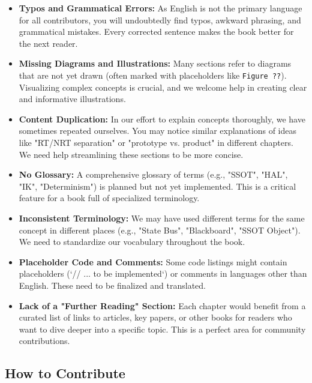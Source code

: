\begin{itemize}
    \item \textbf{Typos and Grammatical Errors:} As English is not the primary language for all contributors, you will undoubtedly find typos, awkward phrasing, and grammatical mistakes. Every corrected sentence makes the book better for the next reader.

    \item \textbf{Missing Diagrams and Illustrations:} Many sections refer to diagrams that are not yet drawn (often marked with placeholders like \texttt{Figure ??}). Visualizing complex concepts is crucial, and we welcome help in creating clear and informative illustrations.

    \item \textbf{Content Duplication:} In our effort to explain concepts thoroughly, we have sometimes repeated ourselves. You may notice similar explanations of ideas like "RT/NRT separation" or "prototype vs. product" in different chapters. We need help streamlining these sections to be more concise.

    \item \textbf{No Glossary:} A comprehensive glossary of terms (e.g., "SSOT", "HAL", "IK", "Determinism") is planned but not yet implemented. This is a critical feature for a book full of specialized terminology.

    \item \textbf{Inconsistent Terminology:} We may have used different terms for the same concept in different places (e.g., "State Bus", "Blackboard", "SSOT Object"). We need to standardize our vocabulary throughout the book.

    \item \textbf{Placeholder Code and Comments:} Some code listings might contain placeholders (`// ... to be implemented`) or comments in languages other than English. These need to be finalized and translated.
    
    \item \textbf{Lack of a "Further Reading" Section:} Each chapter would benefit from a curated list of links to articles, key papers, or other books for readers who want to dive deeper into a specific topic. This is a perfect area for community contributions.
\end{itemize}

\vspace{2ex}
\subsection*{How to Contribute}

